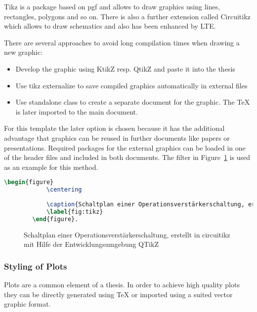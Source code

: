 		Tikz is a package based on pgf and allows to draw graphics using lines, rectangles, polygons and so on. There is also a further extension called Circuitikz which allows to draw schematics and also has been enhanced by \acs{LTE}.
		
		There are several approaches to avoid long compilation times when drawing a new graphic:
		
		\begin{itemize}
			\item Develop the graphic using KtikZ resp. QtikZ and paste it into the thesis
			\item Use tikz externalize to save compiled graphics automatically in external files
			\item Use standalone class to create a separate document for the graphic. The {\TeX} is later imported to the main document.
		\end{itemize}
	
		For this template the later option is chosen because it has the additional advantage that graphics can be reused in further documents like papers or presentations. Required packages for the external graphics can be loaded in one of the header files and included in both documents. The filter in Figure~\ref{fig:tikz} is used as an example for this method.
		
		\begin{lstlisting}[language=TeX]
		\begin{figure}
			\centering
			
			\caption{Schaltplan einer Operationsverstärkerschaltung, erstellt in circuitikz mit Hilfe der Entwicklungsumgebung QTikZ}
			\label{fig:tikz}
		\end{figure}.
		\end{lstlisting}
		
		\begin{figure}
			\centering
			
			\caption{Schaltplan einer Operationsverstärkerschaltung, erstellt in circuitikz mit Hilfe der Entwicklungsumgebung QTikZ}
			\label{fig:tikz}
		\end{figure}
	
		\subsubsection{Styling of Plots}
		
		Plots are a common element of a thesis. In order to achieve high quality plots they can be directly generated using {\TeX} or imported using a suited vector graphic format.
		
